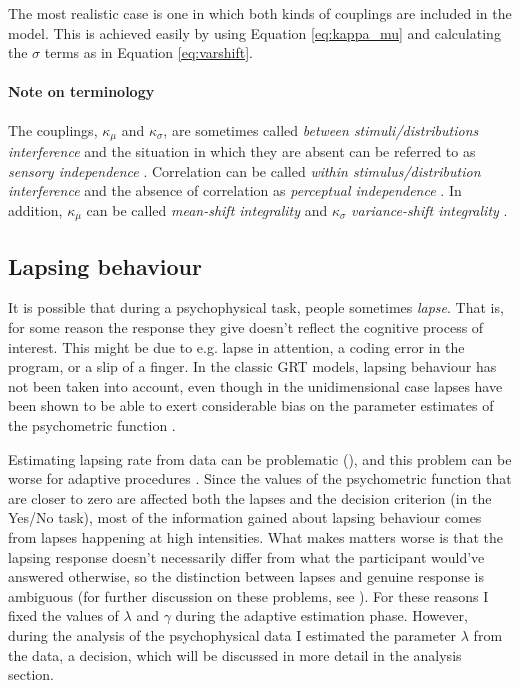\documentclass{article}\usepackage{knitr}
\begin{document}
The most realistic case is one in which both kinds of couplings are included in the model. This is achieved easily by using Equation \ref{eq:kappa_mu} and calculating the $\sigma$ terms as in Equation \ref{eq:varshift}.

\paragraph{Note on terminology} 

The couplings, $\kappa_{\mu}$ and $\kappa_{\sigma}$, are sometimes called \textit{between stimuli/distributions interference} \citep{silbert2009} and the situation in which they are absent can be referred to as \textit{sensory independence} \citep{ashby2015}. Correlation can be called \textit{within stimulus/distribution interference} \citep{silbert2009} and the absence of correlation as \textit{perceptual independence} \citep{ashby2015}. In addition, $\kappa_{\mu}$ can be called \textit{mean-shift integrality} and $\kappa_{\sigma}$ \textit{variance-shift integrality} \citep{ashby1994}.

\subsection{Lapsing behaviour}
\label{sec:lapses_general}

It is possible that during a psychophysical task, people sometimes \textit{lapse}. That is, for some reason the response they give doesn't reflect the cognitive process of interest. This might be due to e.g. lapse in attention, a coding error in the program, or a slip of a finger. In the classic GRT models, lapsing behaviour has not been taken into account, even though in the unidimensional case lapses have been shown to be able to exert considerable bias on the parameter estimates of the psychometric function \citep{wichmannhill2001}. 

Estimating lapsing rate from data can be problematic (\cite{wichmannhill2001, treutwein1999}), and this problem can be worse for adaptive procedures \citep{prins2012}. Since the values of the psychometric function that are closer to zero are affected both the lapses and the decision criterion (in the Yes/No task), most of the information gained about lapsing behaviour comes from lapses happening at high intensities. What makes matters worse is that the lapsing response doesn't necessarily differ from what the participant would've answered otherwise, so the distinction between lapses and genuine response is ambiguous (for further discussion on these problems, see \cite{prins2012}). For these reasons I fixed the values of $\lambda$ and $\gamma$ during the adaptive estimation phase. However, during the analysis of the psychophysical data I estimated the parameter $\lambda$ from the data, a decision, which will be discussed in more detail in the analysis section.
\end{document}

